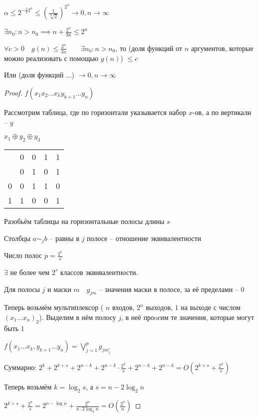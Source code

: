 \documentclass{book}
\theoremstyle{definition}
\begin{document}
$\alpha\leqslant 2^{-\frac{1}{3}2^n}\leqslant \left( \frac{1}{\sqrt[3]{2} } \right)^{2^n} \to 0, n\to \infty  $

$\exists n_0: n>n_0 \implies  n+\frac{2^n}{3n}\leqslant 2^n$ 

\begin{theorem}
    $\forall c>0 \quad g(n)\leqslant \frac{2^n}{3n}\qquad\exists n_0: n>n_0$, то (доля функций от $n$ аргументов, которые можно реализовать с помощью $g(n)$) $\leqslant c$ 

    Или (доля функций $\ldots$) $\to 0, n\to \infty $

\end{theorem}
\begin{proof}
    $f(x_1x_2\ldots x_ky_{k+1}\ldots y_{n})$

    Рассмотрим таблица, где по горизонтали указывается набор $x$-ов, а по вертикали --  $y$

    $x_1\oplus y_2\oplus y_3$
    
    \begin{tabular}{c|cccc}
       &0&0&1&1\\
       &0&1&0&1\\\hline
        0&0&1&1&0\\
        1&1&0&0&1\\
    \end{tabular}

    Разобьём таблицы на горизонтальные полосы длины $s$

    Столбцы  $a\sim_j b$ -- равны в $j$ полосе -- отношение эквивалентности

    Число полос  $p = \frac{2^k}{s}$ 

    $\exists $ не более чем $2^s$ классов эквивалентности.

    Для полосы  $j$ и маски  $m\quad g_{jm}$ -- значения маски в полосе, за её пределами --  $0$

    Теперь возьмём мультиплексор ( $n$ входов,  $2^n$ выходов,  $1$ на выходе с числом  $(x_1\ldots x_{n})_2 $). Выделим в нём полосу $j$, в неё проorим те значения, которые могут быть $1$

    $f(x_1 \ldots x_k, y_{k+1} \ldots y_{n} ) = \bigvee\limits_{j=1}^p g_{jm_j^c}$

    Суммарно: $2^{k} + 2^{k+s} + 2^{n-k} + 2^{n-k}\cdot \frac{2^k}{s} + 2^{n-k} + 2^{n-k} = O\left( 2^{k+s}+ \frac{2^n}{s} \right) $ 

    Теперь возьмём $k=\log _2 s$, а $s = n-2\log _2 n$

    $2^{k+s} + \frac{2^n}{s} = 2^{n-\log n}+ \frac{2^n}{n\cdot 2\log_2 n} = O\left( \frac{2^n}{n} \right) $


\end{proof}
\end{document}
